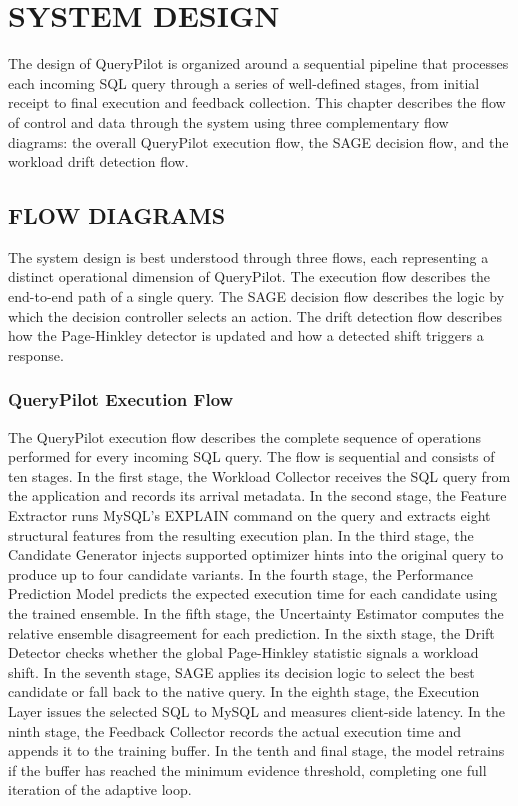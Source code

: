 
\chapter{SYSTEM DESIGN}
\label{chap:system_design}

The design of QueryPilot is organized around a sequential pipeline that
processes each incoming SQL query through a series of well-defined stages,
from initial receipt to final execution and feedback collection. This chapter
describes the flow of control and data through the system using three
complementary flow diagrams: the overall QueryPilot execution flow, the SAGE
decision flow, and the workload drift detection flow.

\section{FLOW DIAGRAMS}
\label{sec:flow_diagrams}

The system design is best understood through three flows, each representing a
distinct operational dimension of QueryPilot. The execution flow describes the
end-to-end path of a single query. The SAGE decision flow describes the logic
by which the decision controller selects an action. The drift detection flow
describes how the Page-Hinkley detector is updated and how a detected shift
triggers a response.

\subsection{QueryPilot Execution Flow}
\label{subsec:execution_flow}

The QueryPilot execution flow describes the complete sequence of operations
performed for every incoming SQL query. The flow is sequential and consists of
ten stages. In the first stage, the Workload Collector receives the SQL query
from the application and records its arrival metadata. In the second stage,
the Feature Extractor runs MySQL's EXPLAIN command on the query and extracts
eight structural features from the resulting execution plan. In the third
stage, the Candidate Generator injects supported optimizer hints into the
original query to produce up to four candidate variants. In the fourth stage,
the Performance Prediction Model predicts the expected execution time for each
candidate using the trained ensemble. In the fifth stage, the Uncertainty
Estimator computes the relative ensemble disagreement for each prediction. In
the sixth stage, the Drift Detector checks whether the global Page-Hinkley
statistic signals a workload shift. In the seventh stage, SAGE applies its
decision logic to select the best candidate or fall back to the native query.
In the eighth stage, the Execution Layer issues the selected SQL to MySQL and
measures client-side latency. In the ninth stage, the Feedback Collector
records the actual execution time and appends it to the training buffer. In the
tenth and final stage, the model retrains if the buffer has reached the minimum
evidence threshold, completing one full iteration of the adaptive loop.

